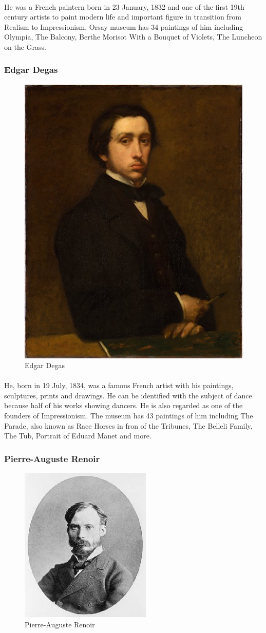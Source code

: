 \documentclass[
10pt, %
a4paper, %
oneside, %
headinclude,footinclude, %
BCOR5mm, %
]{scrartcl}
\theoremstyle{definition} %
\theoremstyle{plain} %
\theoremstyle{remark} %
\begin{document}
\paragraph{}
He was a French paintern born in 23 January, 1832 and one of the first 19th century artists to paint modern life and important figure in transition from Realism to Impressionism. Orsay museum has 34 paintings of him including Olympia, The Balcony, Berthe Morisot With a Bouquet of Violets, The Luncheon on the Grass.

\subsubsection{Edgar Degas}
\begin{figure}[tbH]
\centering
\includegraphics[width=.30\columnwidth]{Images/12.png}
\caption[Edgar Degas]{Edgar Degas} %
\label{fig:degas}
\end{figure}

\paragraph{}
He, born in 19 July, 1834, was a famous French artist with his paintings, sculptures, prints and drawings. He can be identified with the subject of dance because half of his works showing dancers. He is also regarded as one of the founders of Impressionism. The museum has 43 paintings of him including The Parade, also known as Race Horses in fron of the Tribunes, The Belleli Family, The Tub, Portrait of Eduard Manet and more.

\subsubsection{Pierre-Auguste Renoir}
\begin{figure}[tbH]
\centering
\includegraphics[width=.30\columnwidth]{Images/13.png}
\caption[Pierre-Auguste Renoir]{Pierre-Auguste Renoir} %
\label{fig:renoir}
\end{figure}
\end{document}
